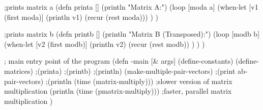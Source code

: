 ;prints matrix a
(defn printa
  []
  (println "Matrix A:")
  (loop [moda a]
    (when-let [v1 (first moda)]
      (println v1)
      (recur (rest moda)))
    )
  )

;prints matrix b
(defn printb
  []
  (println "Matrix B (Transposed):")
  (loop [modb b]
    (when-let [v2 (first modb)]
      (println v2)
      (recur (rest modb))
      )
    )
  )

; main entry point of the program
(defn -main
  [& args]
  (define-constants)
  (define-matrices)
  ;(printa)
  ;(printb)
  ;(println)
  (make-multiple-pair-vectors)
  ;(print ab-pair-vectors)
  ;(println (time (matrix-multiply))) ;slower version of matrix multiplication
  (println (time (pmatrix-multiply))) ;faster, parallel matrix multiplication
  )